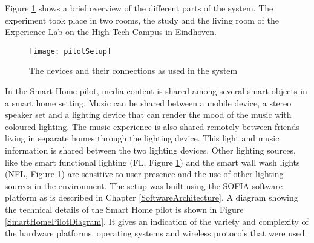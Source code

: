
Figure \ref{pilotSetup} shows a brief overview of the different parts of the system. The experiment took place in two rooms, the study and the living room of the Experience Lab on the High Tech Campus in Eindhoven. %

\begin{figure}
\centering
\texttt{[image: pilotSetup]}
\caption{The devices and their connections as used in the system}
\label{pilotSetup}
\end{figure}

In the Smart Home pilot, media content is shared among several smart objects in a smart home setting. Music can be shared between a mobile device, a stereo speaker set and a lighting device that can render the mood of the music with coloured lighting. The music experience is also shared remotely between friends living in separate homes through the lighting device. This light and music information is shared between the two lighting devices. Other lighting sources, like the smart functional lighting (FL, Figure \ref{pilotSetup}) and the smart wall wash lights (NFL, Figure \ref{pilotSetup}) are sensitive to user presence and the use of other lighting sources in the environment. The setup was built using the \ac{SOFIA} software platform as is described in Chapter \ref{SoftwareArchitecture}. A diagram showing the technical details of the Smart Home pilot is shown in Figure \ref{SmartHomePilotDiagram}. It gives an indication of the variety and complexity of the hardware platforms, operating systems and wireless protocols that were used.

